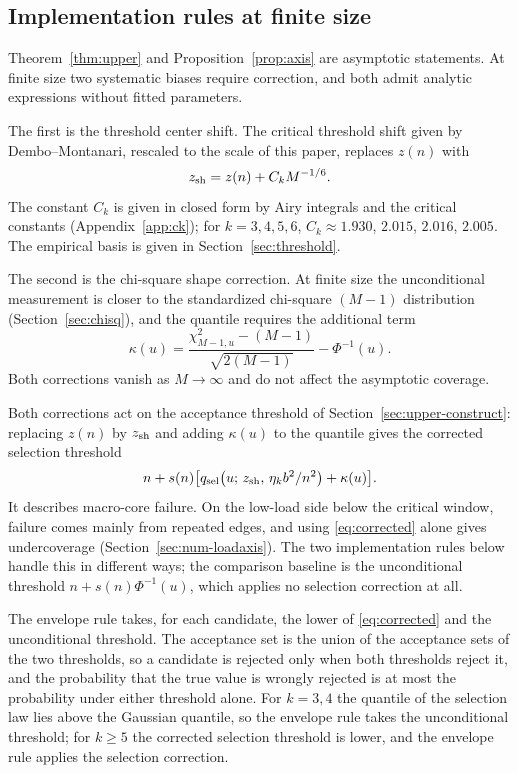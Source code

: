 \subsection{Implementation rules at finite size}\label{sec:rules}
Theorem~\ref{thm:upper} and Proposition~\ref{prop:axis} are asymptotic statements. At finite
size two systematic biases require correction, and both admit analytic expressions without
fitted parameters.

The first is the threshold center shift. The critical threshold shift given by
Dembo--Montanari\cite{dm}, rescaled to the scale of this paper, replaces $z(n)$ with
\begin{equation*}
z_{\rm sh} = z(n) + C_k M^{-1/6}.
\end{equation*}
The constant $C_k$ is given in closed form by Airy integrals and the critical constants
(Appendix~\ref{app:ck}); for $k = 3, 4, 5, 6$, $C_k \approx 1.930$, $2.015$, $2.016$, $2.005$.
The empirical basis is given in Section~\ref{sec:threshold}.

The second is the chi-square shape correction. At finite size the unconditional measurement
is closer to the standardized chi-square $(M-1)$ distribution (Section~\ref{sec:chisq}), and
the quantile requires the additional term
\begin{equation*}
\kappa(u) = \frac{\chi^2_{M-1,u} - (M-1)}{\sqrt{2(M-1)}} - \Phi^{-1}(u).
\end{equation*}
Both corrections vanish as $M \to \infty$ and do not affect the asymptotic coverage.

Both corrections act on the acceptance threshold of Section~\ref{sec:upper-construct}:
replacing $z(n)$ by $z_{\rm sh}$ and adding $\kappa(u)$ to the quantile gives the corrected
selection threshold
\begin{equation}
n + s(n)\bigl[q_{\rm sel}\bigl(u;\,z_{\rm sh},\,\eta_k b^2/n^2\bigr) + \kappa(u)\bigr].
\label{eq:corrected}
\end{equation}
It describes macro-core failure. On the low-load side below the critical window, failure comes
mainly from repeated edges, and using \eqref{eq:corrected} alone gives undercoverage
(Section~\ref{sec:num-loadaxis}). The two implementation rules below handle this in different
ways; the comparison baseline is the unconditional threshold $n + s(n)\Phi^{-1}(u)$, which
applies no selection correction at all.

The envelope rule takes, for each candidate, the lower of \eqref{eq:corrected} and the
unconditional threshold. The acceptance set is the union of the acceptance sets of the two
thresholds, so a candidate is rejected only when both thresholds reject it, and the probability
that the true value is wrongly rejected is at most the probability under either threshold alone.
For $k = 3, 4$ the quantile of the selection law lies above the Gaussian quantile, so the
envelope rule takes the unconditional threshold; for $k \ge 5$ the corrected selection
threshold is lower, and the envelope rule applies the selection correction.

